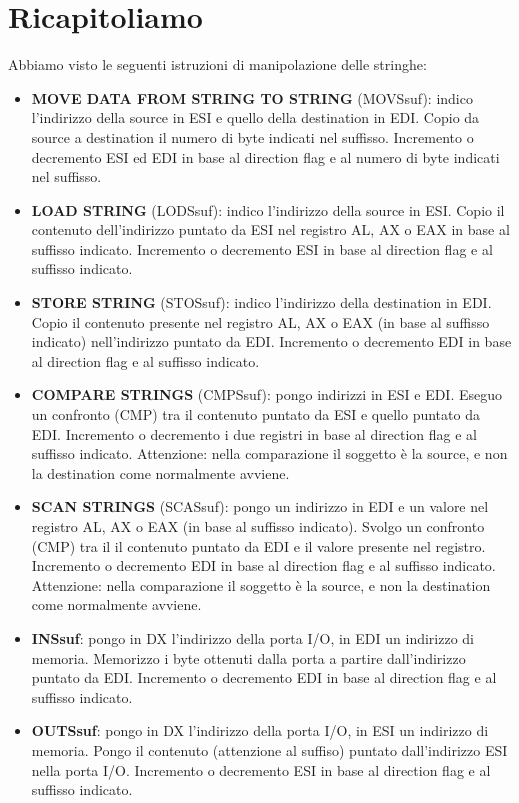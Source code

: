 \documentclass[11pt]{report}
\begin{document}
\section{Ricapitoliamo}
Abbiamo visto le seguenti istruzioni di manipolazione delle stringhe:
\begin{itemize}
\item \textbf{MOVE DATA FROM STRING TO STRING} (MOVSsuf): indico l'indirizzo della source in ESI e quello della destination in EDI. Copio da source a destination il numero di byte indicati nel suffisso. Incremento o decremento ESI ed EDI in base al direction flag e al numero di byte indicati nel suffisso.
\item \textbf{LOAD STRING}  (LODSsuf): indico l'indirizzo della source in ESI. Copio il contenuto dell'indirizzo puntato da ESI nel registro AL, AX o EAX in base al suffisso indicato. Incremento o decremento ESI in base al direction flag e al suffisso indicato.
\item \textbf{STORE STRING} (STOSsuf): indico l'indirizzo della destination in EDI. Copio il contenuto presente nel registro AL, AX o EAX (in base al suffisso indicato) nell'indirizzo puntato da EDI. Incremento o decremento EDI in base al direction flag e al suffisso indicato.
\item \textbf{COMPARE STRINGS} (CMPSsuf): pongo indirizzi in ESI e EDI. Eseguo un confronto (CMP) tra il contenuto puntato da ESI e quello puntato da EDI. Incremento o decremento i due registri in base al direction flag e al suffisso indicato. Attenzione: nella comparazione il soggetto è la source, e non la destination come normalmente avviene.
\item \textbf{SCAN STRINGS} (SCASsuf): pongo un indirizzo in EDI e un valore nel registro AL, AX o EAX (in base al suffisso indicato). Svolgo un confronto (CMP) tra il il contenuto puntato da EDI e il valore presente nel registro. Incremento o decremento EDI in base al direction flag e al suffisso indicato. Attenzione: nella comparazione il soggetto è la source, e non la destination come normalmente avviene.\\
\item \textbf{INSsuf}: pongo in DX l'indirizzo della porta I/O, in EDI un indirizzo di memoria. Memorizzo i byte ottenuti dalla porta a partire dall'indirizzo puntato da EDI. Incremento o decremento EDI in base al direction flag e al suffisso indicato.
\item \textbf{OUTSsuf}: pongo in DX l'indirizzo della porta I/O, in ESI un indirizzo di memoria. Pongo il contenuto (attenzione al suffiso) puntato dall'indirizzo ESI nella porta I/O. Incremento o decremento ESI in base al direction flag e al suffisso indicato.
\end{itemize}
\end{document}
